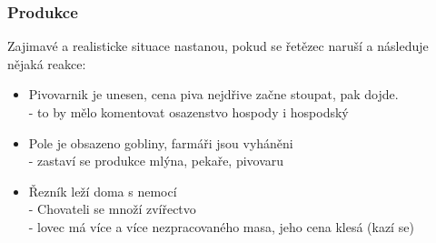 ﻿\documentclass[a4paper]{beamer}
\begin{document}
\begin{frame}
\frametitle{Produkce}

Zajimavé a realisticke situace nastanou, pokud se řetězec naruší a následuje nějaká reakce:
    
    \begin{itemize}
        \item Pivovarnik je unesen, cena piva nejdřive začne stoupat, pak dojde. 
        \\ - to by mělo komentovat osazenstvo hospody i hospodský
        \item Pole je obsazeno gobliny, farmáři jsou vyháněni
        \\ - zastaví se produkce mlýna, pekaře, pivovaru
        \item Řezník leží doma s nemocí
        \\ - Chovateli se množí zvířectvo
        \\ - lovec má více a více nezpracovaného masa, jeho cena klesá (kazí se)
    \end{itemize}
    
    
\end{frame}
\end{document}
